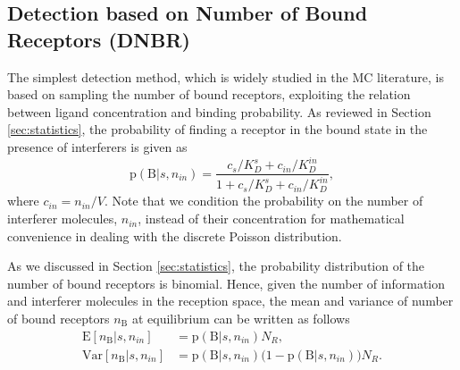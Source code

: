 \documentclass[twocolumn]{IEEEtran}
\newcommand{\p}{\mathrm{p}}
\newcommand{\B}{\mathrm{B}}
\newcommand{\E}{\mathrm{E}}
\newcommand{\Var}{\mathrm{Var}}
\begin{document}



\subsection{Detection based on Number of Bound Receptors (DNBR)}

The simplest detection method, which is widely studied in the MC literature, is based on sampling the number of bound receptors, exploiting the relation between ligand concentration and binding probability. As reviewed in Section \ref{sec:statistics}, the probability of finding a receptor in the bound state in the presence of interferers is given as
\begin{equation} \label{probBinding}
\p(\B|s, n_{in})  = \frac{c_s/K_D^s + c_{in}/K_D^{in}  }{1 + c_s/K_D^s + c_{in}/K_D^{in}},
\end{equation}
where $c_{in} = n_{in}/V$. Note that we condition the probability on the number of interferer molecules, $n_{in}$, instead of their concentration for mathematical convenience in dealing with the discrete Poisson distribution. 

As we discussed in Section \ref{sec:statistics}, the probability distribution of the number of bound receptors is binomial. Hence, given the number of information and interferer molecules in the reception space, the mean and variance of number of bound receptors $n_\B$ at equilibrium can be written as follows
\begin{align}
\E[n_\B|s, n_{in}] &= \p(\B|s, n_{in})  N_R, \\ \nonumber
\Var[n_\B|s, n_{in}] &= \p(\B|s, n_{in})  \bigl(1-\p(\B|s, n_{in}) \bigr) N_R.  \label{eq:Binomial}
\end{align}
\end{document}
